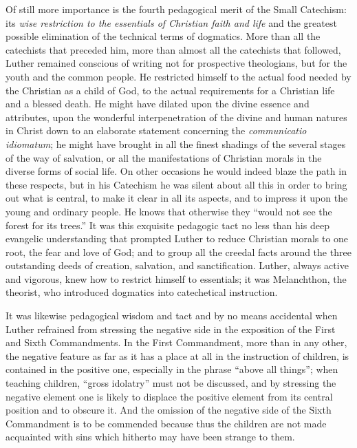 Of still more importance is the fourth pedagogical merit of the Small Catechism: its \emph{wise restriction to the essentials of Christian faith and life} and the greatest possible elimination of the technical terms of dogmatics. More than all the catechists that preceded him, more than almost all the catechists that followed, Luther remained conscious of writing not for prospective theologians, but for the youth
and the common people. He restricted himself to the actual food needed by the Christian as a child of God, to the actual requirements for a Christian life and a blessed death. He might have dilated upon the divine essence and attributes, upon the wonderful interpenetration of the divine and human natures in Christ down to an elaborate statement concerning the \emph{communicatio idiomatum}; he might have brought in all the finest shadings of the several stages of the way of salvation, or all the manifestations of Christian morals in the diverse forms of social life. On other occasions he would indeed blaze the path in these respects, but in his Catechism he was silent about all this in order to bring out what is central, to make it clear in all its aspects, and to impress it upon the young and ordinary people. He knows that otherwise they “would not see the forest for its trees.” It was this exquisite pedagogic tact no less than his deep evangelic understanding that prompted Luther to reduce Christian morals to one root, the fear and love of God; and to group all the creedal facts around the three outstanding deeds of creation, salvation, and sanctification. Luther, always active and vigorous, knew how to restrict himself to essentials; it was Melanchthon, the theorist, who introduced dogmatics into catechetical instruction.

It was likewise pedagogical wisdom and tact and by no means accidental when Luther refrained from stressing the negative side in the exposition of the First and Sixth Commandments. In the First Commandment, more than in any other, the negative feature as far as it has a place at all in the instruction of children, is contained in the positive one, especially in the phrase “above all things”; when teaching children, “gross idolatry” must not be discussed, and by stressing the negative element one is likely to displace the positive element from its central position and to obscure it. And the omission of the negative side of the Sixth Commandment is to be commended because thus the children are not made acquainted with sins which hitherto may have been strange to them.

